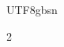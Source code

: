 \documentclass{article}
\begin{document}
\begin{CJK}{UTF8}{gbsn}
\begin{multicols}{2}






    \end{multicols}

    
    

    \clearpage\end{CJK}
\end{document}
